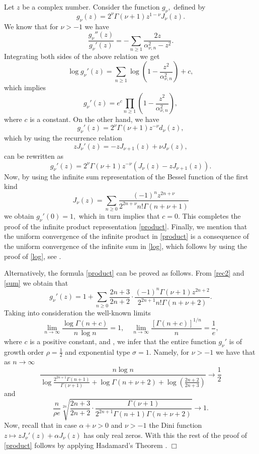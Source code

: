 \documentclass[journal]{IEEEtran}
\begin{document}
 Let $z$ be a complex number. Consider the function $g_{\nu},$ defined by $$g_{\nu}(z)=2^{\nu}\Gamma(\nu+1)z^{1-\nu}J_{\nu}(z).$$
We know that for $\nu>-1$ we have \cite[Lemma 4]{szasz}
\begin{equation}\label{log}\frac{g_{\nu}''(z)}{g_{\nu}'(z)}=-\sum_{n\geq1}\frac{2z}{\alpha_{\nu,n}^2-z^2}.\end{equation}
Integrating both sides of the above relation we get
$$\log g_{\nu}'(z)=\sum_{n\geq 1}\log\left(1-\frac{z^2}{\alpha_{\nu,n}^2}\right)+c,$$
which implies
$$g_{\nu}'(z)=e^{c}\prod_{n\geq1}\left(1-\frac{z^2}{\alpha_{\nu,n}^2}\right),$$
where $c$ is a constant. On the other hand, we have
$$g_{\nu}'(z)=2^{\nu}\Gamma(\nu+1)z^{-\nu}d_{\nu}(z),$$
which by using the recurrence relation
\begin{equation}\label{rec}zJ_{\nu}'(z)=-zJ_{\nu+1}(z)+\nu J_{\nu}(z),\end{equation}
can be rewritten as
\begin{equation}\label{rec2}g_{\nu}'(z)=2^{\nu}\Gamma(\nu+1)z^{-\nu}\left(J_{\nu}(z)-zJ_{\nu+1}(z)\right).\end{equation}
Now, by using the infinite sum representation of the Bessel function of the first kind
\begin{equation}\label{sum}J_{\nu}(z)=\sum_{n\geq 0}\frac{(-1)^nz^{2n+\nu}}{2^{2n+\nu}n!\Gamma(n+\nu+1)}\end{equation}
we obtain $g_{\nu}'(0)=1,$ which in turn implies that $c=0.$ This completes the proof of the infinite product representation \eqref{product}. Finally, we mention that the uniform convergence of the infinite product in \eqref{product} is a consequence of the uniform convergence of the infinite sum in \eqref{log}, which follows by using the proof of \eqref{log}, see \cite[Lemma 4]{szasz}.

Alternatively, the formula \eqref{product} can be proved as follows. From \eqref{rec2} and \eqref{sum} we obtain that
$$g_{\nu}'(z)=1+\sum_{n\geq0}\frac{2n+3}{2n+2}\cdot\frac{(-1)^n \Gamma(\nu+1)z^{2n+2}}{2^{2n+1}n!\Gamma(n+\nu+2)}.$$
Taking into consideration the well-known limits
$$
\lim_{n\to \infty} \frac{\log \Gamma(n+c)}{n\,\log n}=1,\quad
\lim_{n\to \infty} \frac{[\Gamma(n+c)]^{1/n}}{n}=\frac{1}{e},
$$
where $c$ is a positive constant, and \cite[p. 6, Theorems 2 and 3]{lev}, we infer that the entire
function $g_{\nu}'$ is of growth order $\rho=\frac{1}{2}$ and exponential type $\sigma=1.$ Namely,
for $\nu>-1$ we have that as $n\to\infty$
$$\frac{n\log n}{\log\frac{2^{2n+1}\Gamma\left(n+1\right)}{\Gamma(\nu+1)}+\log\Gamma\left(n+\nu+2\right)+\log\left(\frac{2n+2}{2n+3}\right)}
\to\frac{1}{2}$$
and
$$\frac{n}{\rho e}\sqrt[2n]{\frac{2n+3}{2n+2}\cdot\frac{\Gamma(\nu+1)}{2^{2n+1}\Gamma(n+1)\Gamma(n+\nu+2)}}\to 1.$$
Now, recall that \cite[p. 597]{watson} in case $\alpha+\nu>0$
and $\nu>-1$ the Dini function $z\mapsto zJ_{\nu}'(z)+\alpha J_{\nu}(z)$ has only real zeros. With this the rest of the proof of \eqref{product} follows by applying Hadamard's Theorem \cite[p. 26]{lev}. \medskip \hfill $\Box$
\end{document}
